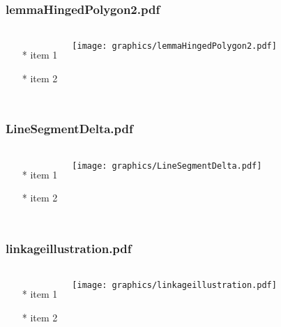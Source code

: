 \begin{frame} \frametitle{lemmaHingedPolygon2.pdf}
    \begin{columns}[c]
        \begin{itemize}
            \item[*] item 1
            \item[*] item 2
        \end{itemize}
        \begin{minipage}{\linewidth}
            \begin{center}
            \texttt{[image: graphics/lemmaHingedPolygon2.pdf]}
            \label{gfx:lemmaHingedPolygon2.pdf}
            \end{center}
        \end{minipage}
    \end{columns}
\end{frame}
\begin{frame} \frametitle{LineSegmentDelta.pdf}
    \begin{columns}[c]
        \begin{itemize}
            \item[*] item 1
            \item[*] item 2
        \end{itemize}
        \begin{minipage}{\linewidth}
            \begin{center}
            \texttt{[image: graphics/LineSegmentDelta.pdf]}
            \label{gfx:LineSegmentDelta.pdf}
            \end{center}
        \end{minipage}
    \end{columns}
\end{frame}
\begin{frame} \frametitle{linkageillustration.pdf}
    \begin{columns}[c]
        \begin{itemize}
            \item[*] item 1
            \item[*] item 2
        \end{itemize}
        \begin{minipage}{\linewidth}
            \begin{center}
            \texttt{[image: graphics/linkageillustration.pdf]}
            \label{gfx:linkageillustration.pdf}
            \end{center}
        \end{minipage}
    \end{columns}
\end{frame}
